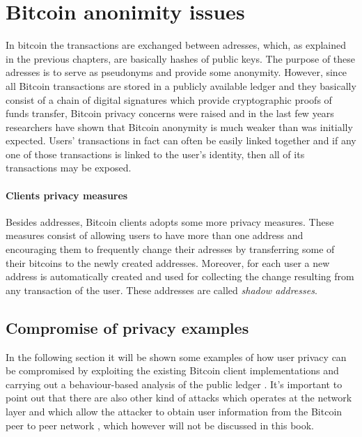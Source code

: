 \section{Bitcoin anonimity issues} In bitcoin the transactions are exchanged
between adresses, which, as explained in  the previous chapters, are basically
hashes of public keys. The purpose of these adresses is to serve as pseudonyms
and provide some anonymity. However, since all Bitcoin transactions are stored
in a publicly available ledger and they basically consist of a chain of
digital signatures which provide cryptographic proofs of funds transfer, Bitcoin
privacy concerns were raised and in the last few years researchers have shown
that Bitcoin anonymity is much weaker than was initially expected. Users’
transactions in fact can often be easily linked together and if any one of those
transactions is linked to the user’s identity, then all of its transactions may
be exposed.


\paragraph{Clients privacy measures} Besides addresses, Bitcoin clients
adopts some more privacy measures. These measures consist of allowing users to
have more than one address and encouraging them to frequently change their
adresses by transferring some of their bitcoins to the newly created addresses.
Moreover, for each user a new address is automatically created and used for
collecting the change resulting from any transaction of the user. These
addresses are called \emph{shadow addresses}.







\subsection{Compromise of privacy examples} In the following section it will be
shown some examples of how user privacy can be compromised by exploiting the
existing Bitcoin client implementations and carrying out a behaviour-based
analysis of the public ledger \cite{karame2016bitcoin}. It's important to point
out that there are also other kind of attacks which operates at the network
layer and which allow the attacker to obtain user information from the Bitcoin
peer to peer network \cite{karame2016bitcoin}, which however will not be
discussed in this book.

